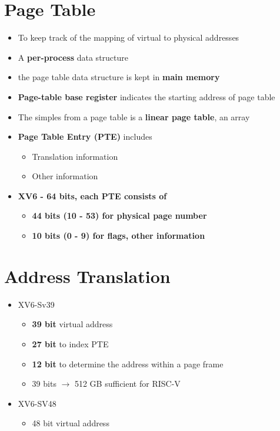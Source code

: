 \documentclass[a4paper,11pt,english]{article}
\begin{document}
\section*{Page Table}
\begin{itemize}
    \item To keep track of the mapping of virtual to physical addresses
    \item A \textbf{\color{blue} per-process} data structure
    \item the page table data structure is kept in \textbf{\color{blue} main memory}
    \item \textbf{\color{blue} Page-table base register} indicates the starting address of page table
    \item The simples from a page table is a \textbf{\color{blue} linear page table}, an array
    \item \textbf{\color{blue} Page Table Entry (PTE)} includes
        \begin{itemize}
            \item Translation information
            \item Other information
        \end{itemize}
    \item \textbf{\color{blue} XV6 - 64 bits, each PTE consists of}
        \begin{itemize}
            \item \textbf{\color{blue} 44 bits (10 - 53) for physical page number}
            \item \textbf{\color{blue} 10 bits (0 - 9) for flags, other information}
        \end{itemize}
\end{itemize}

\section*{Address Translation}
\begin{itemize}
    \item XV6-Sv39
        \begin{itemize}
            \item \textbf{\color{blue} 39 bit} virtual address
            \item \textbf{\color{blue} 27 bit} to index PTE
            \item \textbf{\color{blue} 12 bit} to determine the address within a page frame
            \item 39 bits $\rightarrow$ 512 GB sufficient for RISC-V
        \end{itemize}
    \item XV6-SV48
        \begin{itemize}
            \item 48 bit virtual address
        \end{itemize}
\end{itemize}
\end{document}
